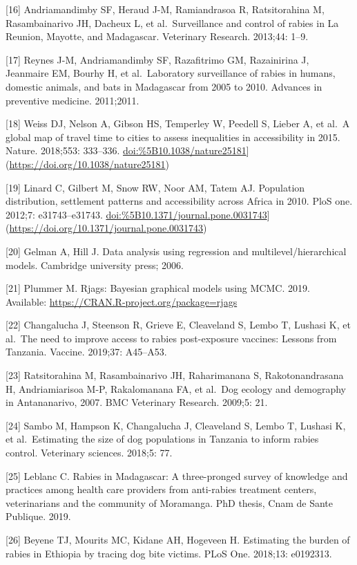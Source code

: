 \documentclass[
]{book}
\begin{document}
{[}16{]} Andriamandimby SF, Heraud J-M, Ramiandrasoa R, Ratsitorahina M,
Rasambainarivo JH, Dacheux L, et al.~Surveillance and control of rabies
in La Reunion, Mayotte, and Madagascar. Veterinary Research. 2013;44:
1--9.

{[}17{]} Reynes J-M, Andriamandimby SF, Razafitrimo GM, Razainirina J,
Jeanmaire EM, Bourhy H, et al.~Laboratory surveillance of rabies in
humans, domestic animals, and bats in Madagascar from 2005 to 2010.
Advances in preventive medicine. 2011;2011.

{[}18{]} Weiss DJ, Nelson A, Gibson HS, Temperley W, Peedell S, Lieber A, et
al.~A global map of travel time to cities to assess inequalities in
accessibility in 2015. Nature. 2018;553: 333--336.
\url{doi:\%5B10.1038/nature25181}{]}(\url{https://doi.org/10.1038/nature25181})

{[}19{]} Linard C, Gilbert M, Snow RW, Noor AM, Tatem AJ. Population
distribution, settlement patterns and accessibility across Africa in
2010. PloS one. 2012;7: e31743--e31743.
\url{doi:\%5B10.1371/journal.pone.0031743}{]}(\url{https://doi.org/10.1371/journal.pone.0031743})

{[}20{]} Gelman A, Hill J. Data analysis using regression and
multilevel/hierarchical models. Cambridge university press; 2006.

{[}21{]} Plummer M. Rjags: Bayesian graphical models using MCMC. 2019.
Available: \url{https://CRAN.R-project.org/package=rjags}

{[}22{]} Changalucha J, Steenson R, Grieve E, Cleaveland S, Lembo T, Lushasi
K, et al.~The need to improve access to rabies post-exposure vaccines:
Lessons from Tanzania. Vaccine. 2019;37: A45--A53.

{[}23{]} Ratsitorahina M, Rasambainarivo JH, Raharimanana S,
Rakotonandrasana H, Andriamiarisoa M-P, Rakalomanana FA, et al.~Dog
ecology and demography in Antananarivo, 2007. BMC Veterinary Research.
2009;5: 21.

{[}24{]} Sambo M, Hampson K, Changalucha J, Cleaveland S, Lembo T, Lushasi
K, et al.~Estimating the size of dog populations in Tanzania to inform
rabies control. Veterinary sciences. 2018;5: 77.

{[}25{]} Leblanc C. Rabies in Madagascar: A three-pronged survey of
knowledge and practices among health care providers from anti-rabies
treatment centers, veterinarians and the community of Moramanga. PhD
thesis, Cnam de Sante Publique. 2019.

{[}26{]} Beyene TJ, Mourits MC, Kidane AH, Hogeveen H. Estimating the burden
of rabies in Ethiopia by tracing dog bite victims. PLoS One. 2018;13:
e0192313.
\end{document}

